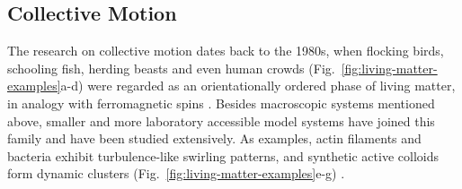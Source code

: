 \subsection{Collective Motion}
The research on collective motion dates back to the 1980s, when flocking birds, schooling fish, herding beasts and even human crowds (Fig.~\ref{fig:living-matter-examples}a-d) were regarded as an orientationally ordered phase of living matter, in analogy with ferromagnetic spins
\cite{Reynolds1987, Vicsek1995, Narayan2007, Ward2008, Ballerini2008, Silverberg2013}. Besides macroscopic systems mentioned above, smaller and more laboratory accessible model systems have joined this family and have been studied extensively. As examples, actin filaments and bacteria exhibit turbulence-like swirling patterns, and synthetic active colloids form dynamic clusters (Fig.~\ref{fig:living-matter-examples}e-g)
\cite{Dunkel2013, Wensink2012, Buttinoni2013, Palacci2013, Sanchez2012, Schaller2010, Sokolov2007}.


